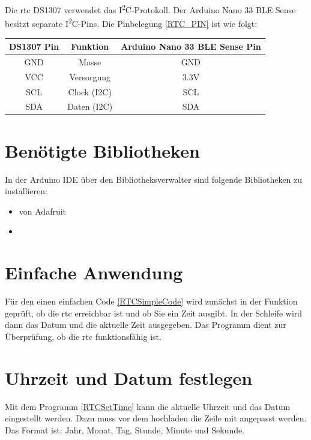 	
	Die \ac{rtc} DS1307 verwendet das I\textsuperscript{2}C-Protokoll. Der Arduino Nano 33 BLE Sense besitzt separate I\textsuperscript{2}C-Pins. Die Pinbelegung \ref{RTC_PIN} ist wie folgt:
	
	\begin{center}
		\label{RTC_PIN}
		\begin{tabular}{|c|c|c|}
			\hline
				\textbf{DS1307 Pin} & \textbf{Funktion} & \textbf{Arduino Nano 33 BLE Sense Pin} \\
			\hline
				GND & Masse & GND \\
			\hline
				VCC & Versorgung & 3.3V \\
			\hline
				SCL & Clock (I2C) & SCL \\
			\hline
				SDA & Daten (I2C) & SDA \\
			\hline
		\end{tabular}
	\end{center}
	
\section{Benötigte Bibliotheken}
	
	In der Arduino IDE über den Bibliotheksverwalter sind folgende Bibliotheken zu installieren:
	
	\begin{itemize}
		\item {} von Adafruit
		\item {} 
	\end{itemize}
	
\section{Einfache Anwendung}

Für den einen einfachen Code \ref{RTCSimpleCode} wird zunächst in der Funktion  geprüft, ob die \ac{rtc} erreichbar ist und ob Sie ein Zeit ausgibt. In der Schleife  wird dann das Datum und die aktuelle Zeit ausgegeben. Das Programm dient zur Überprüfung, ob die \ac{rtc} funktionsfähig ist.


{
  \label{RTCSimpleCode}
}

\section{Uhrzeit und Datum festlegen}\label{Zeiteinstellen}

Mit dem Programm \ref{RTCSetTime} kann die aktuelle Uhrzeit und das Datum eingestellt werden.
Dazu muss vor dem hochladen die Zeile mit  angepasst werden. Das Format ist: Jahr, Monat, Tag, Stunde, Minute und Sekunde. 
	

{
  \label{RTCSetTime}
}